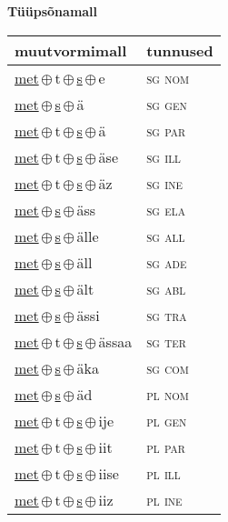 

\vspace{3.5em}
\noindent \begin{minipage}{\textwidth}
\noindent \textbf{Tüüpsõnamall \,}\\

\begin{sideways}
\begin{tabular}{l l}
muutvormimall & tunnused \\
\hline
\underline{met}\,$\oplus$\,t\,$\oplus$\,\underline{s}\,$\oplus$\,e & \textsc{ sg nom } \\
\underline{met}\,$\oplus$\,\underline{s}\,$\oplus$\,ä & \textsc{ sg gen } \\
\underline{met}\,$\oplus$\,t\,$\oplus$\,\underline{s}\,$\oplus$\,ä & \textsc{ sg par } \\
\underline{met}\,$\oplus$\,t\,$\oplus$\,\underline{s}\,$\oplus$\,äse & \textsc{ sg ill } \\
\underline{met}\,$\oplus$\,t\,$\oplus$\,\underline{s}\,$\oplus$\,äz & \textsc{ sg ine } \\
\underline{met}\,$\oplus$\,\underline{s}\,$\oplus$\,äss & \textsc{ sg ela } \\
\underline{met}\,$\oplus$\,\underline{s}\,$\oplus$\,älle & \textsc{ sg all } \\
\underline{met}\,$\oplus$\,\underline{s}\,$\oplus$\,äll & \textsc{ sg ade } \\
\underline{met}\,$\oplus$\,\underline{s}\,$\oplus$\,ält & \textsc{ sg abl } \\
\underline{met}\,$\oplus$\,\underline{s}\,$\oplus$\,ässi & \textsc{ sg tra } \\
\underline{met}\,$\oplus$\,t\,$\oplus$\,\underline{s}\,$\oplus$\,ässaa & \textsc{ sg ter } \\
\underline{met}\,$\oplus$\,\underline{s}\,$\oplus$\,äka & \textsc{ sg com } \\
\underline{met}\,$\oplus$\,\underline{s}\,$\oplus$\,äd & \textsc{ pl nom } \\
\underline{met}\,$\oplus$\,t\,$\oplus$\,\underline{s}\,$\oplus$\,ije & \textsc{ pl gen } \\
\underline{met}\,$\oplus$\,t\,$\oplus$\,\underline{s}\,$\oplus$\,iit & \textsc{ pl par } \\
\underline{met}\,$\oplus$\,t\,$\oplus$\,\underline{s}\,$\oplus$\,iise & \textsc{ pl ill } \\
\underline{met}\,$\oplus$\,t\,$\oplus$\,\underline{s}\,$\oplus$\,iiz & \textsc{ pl ine } \\

\end{tabular}
\end{sideways}
\end{minipage}
